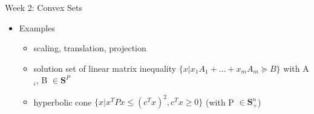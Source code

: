 \documentclass{article}
\begin{document}
\begin{homeworkProblemName}{{\LARGE Week 2: Convex Sets}}
\begin{problemAnswer}
{\begin{itemize}
\begin{itemize}
        \item The inverse image f$^{-1}$(C) of a convex set under f is convex

          \[C \subseteq \bm{R^m} \text{ convex } \implies f^{-1}(C) = \{x \in \bm{R^n} | f(x) \in C\} \text{ convex}\]
        \end{itemize}

      \item Examples
        \begin{itemize}
        \item scaling, translation, projection
        \item solution set of linear matrix inequality $\{x | x_1A_1 + ... +
          x_mA_m \succeq B\}$ with A$_i$, B $\in \bm{S}^P$
        \item hyperbolic cone $\{x | x^TPx \leq(c^Tx)^2, c^Tx \geq 0\}$ (with P $\in \bm{S}^n_+$)

      \end{itemize}
      \end{itemize}
    }\end{problemAnswer}

\end{homeworkProblemName}
\end{document}
